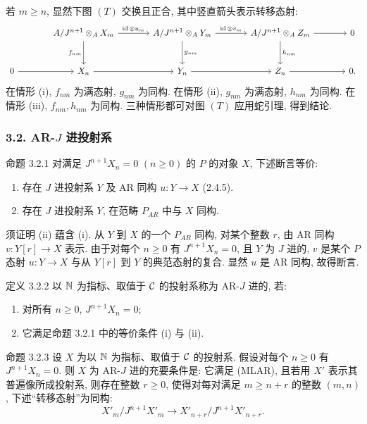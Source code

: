 \begin{prooftext}[证明]
若 $m\ge n$, 显然下图 $(T)$ 交换且正合, 其中竖直箭头表示转移态射:
\[
\begin{tikzcd}[column sep=large,row sep=large]
{} & A/J^{n+1}\otimes_A X_m \arrow[r,"\id\otimes u_m"] \arrow[d,"f_{nm}"'] & A/J^{n+1}\otimes_A Y_m \arrow[r,"\id\otimes v_m"] \arrow[d,"g_{nm}"] & A/J^{n+1}\otimes_A Z_m \arrow[r] \arrow[d,"h_{nm}"] & 0\\
0 \arrow[r] & X_n \arrow[r] & Y_n \arrow[r] & Z_n \arrow[r] & 0 .
\end{tikzcd}
\]
在情形 (i), $f_{nm}$ 为满态射, $g_{nm}$ 为同构. 在情形 (ii), $g_{nm}$ 为满态射, $h_{nm}$ 为同构. 在情形 (iii), $f_{nm},h_{nm}$ 为同构. 三种情形都可对图 $(T)$ 应用蛇引理, 得到结论.
\end{prooftext}

\subsubsection*{3.2. AR-$J$ 进投射系}
\begin{statement}{命题 3.2.1}
对满足 $J^{n+1}X_n=0$ $(n\ge0)$ 的 $P$ 的对象 $X$, 下述断言等价:
\begin{enumerate}[label=(\roman*)]
\item 存在 $J$ 进投射系 $Y$ 及 AR 同构 $u:Y\to X$ (2.4.5).
\item 存在 $J$ 进投射系 $Y$, 在范畴 $P_{AR}$ 中与 $X$ 同构.
\end{enumerate}
\end{statement}

\begin{prooftext}[证明]
须证明 (ii) 蕴含 (i). 从 $Y$ 到 $X$ 的一个 $P_{AR}$ 同构, 对某个整数 $r$, 由 AR 同构 $v:Y[r]\to X$ 表示. 由于对每个 $n\ge0$ 有 $J^{n+1}X_n=0$, 且 $Y$ 为 $J$ 进的, $v$ 是某个 $P$ 态射 $u:Y\to X$ 与从 $Y[r]$ 到 $Y$ 的典范态射的复合. 显然 $u$ 是 AR 同构, 故得断言.
\end{prooftext}

\begin{statement}{定义 3.2.2}
以 $\mathbb N$ 为指标、取值于 $\mathcal C$ 的投射系称为 AR-$J$ 进的, 若:
\begin{enumerate}[label=(\alph*)]
\item 对所有 $n\ge0$, $J^{n+1}X_n=0$;
\item 它满足命题 3.2.1 中的等价条件 (i) 与 (ii).
\end{enumerate}
\end{statement}

\begin{statement}{命题 3.2.3}
设 $X$ 为以 $\mathbb N$ 为指标、取值于 $\mathcal C$ 的投射系. 假设对每个 $n\ge0$ 有 $J^{n+1}X_n=0$. 则 $X$ 为 AR-$J$ 进的充要条件是: 它满足 (MLAR), 且若用 $X'$ 表示其普遍像所成投射系, 则存在整数 $r\ge0$, 使得对每对满足 $m\ge n+r$ 的整数 $(m,n)$, 下述``转移态射''为同构:
\[
X'_m/J^{n+1}X'_m\longrightarrow X'_{n+r}/J^{n+1}X'_{n+r}.
\]
\end{statement}

